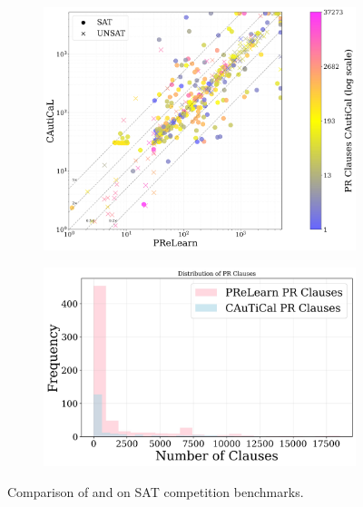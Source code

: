   \begin{figure}[!t]
    \centering
    \begin{subfigure}[t]{0.45\textwidth}
        \centering
        \includegraphics[width=\textwidth]{figs/prelearn_vs_cautical_nontrivial.jpg}
        \label{fig:cautical-vs-cadical}
    \end{subfigure}
    \hspace{0.06\textwidth}
    \begin{subfigure}[t]{0.45\textwidth}
        \centering
        \includegraphics[width=\textwidth]{figs/clauses_histogram.jpg}
        \label{fig:cautical-vs-prelearn}
    \end{subfigure}
    \caption{Comparison of \tool and \prelearn on SAT competition benchmarks.}
\end{figure}





